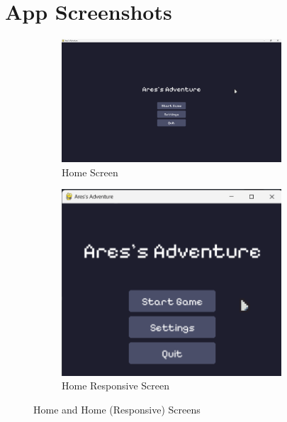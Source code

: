\section{App Screenshots}
\begin{figure}[!ht]
	\centering
	\begin{subfigure}{0.46\textwidth}
		\centering
		\includegraphics[width=0.9\textwidth]{imgs/screenshots/home.png}
		\caption{Home Screen}
	\end{subfigure}
	\hfill
	\begin{subfigure}{0.46\textwidth}
		\centering
		\includegraphics[width=0.9\textwidth]{imgs/screenshots/home_responsive.png}
		\caption{Home Responsive Screen}
	\end{subfigure}
	\caption{Home and Home (Responsive) Screens}
\end{figure}
